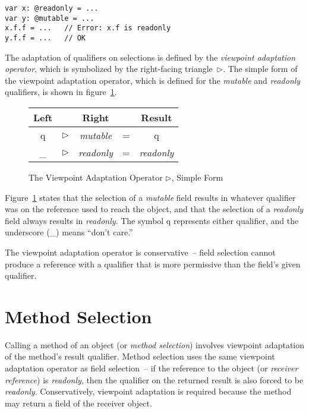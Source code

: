 \begin{lstlisting}[caption={Field Selection},float={htp},label={lst-field-sel}]
var x: @readonly = ...
var y: @mutable = ...
x.f.f = ...   // Error: x.f is readonly
y.f.f = ...   // OK
\end{lstlisting}

The adaptation of qualifiers on selections is defined by the {\em viewpoint adaptation operator},
which is symbolized by the right-facing triangle~$\triangleright$.
The simple form of the viewpoint adaptation operator, which is defined for
the {\em mutable} and {\em readonly} qualifiers, is shown in figure~\ref{fig-vp-simple}.

\begin{figure}[htp]
	\center
	\begin{tabular}{ccccc}
		Left & & Right & & Result \\
		\hline
		q & $\triangleright$ & {\em mutable} & = & q \\
		\_ & $\triangleright$ & {\em readonly} & = & {\em readonly} \\
	\end{tabular}
	\caption{The Viewpoint Adaptation Operator $\triangleright$, Simple Form}
	\label{fig-vp-simple}
\end{figure}

Figure~\ref{fig-vp-simple} states that the selection of a {\em mutable}
field results in whatever qualifier was on the reference used to reach the object,
and that the selection of a {\em readonly} field always results in {\em readonly}.
The symbol q represents either qualifier, and the underscore (\_) means ``don't care.''

The viewpoint adaptation operator is conservative~-- field selection
cannot produce a reference with a qualifier that is more permissive
than the field's given qualifier.

\section{Method Selection} \label{sec-method-sel}

Calling a method of an object (or {\em method selection}) involves
viewpoint adaptation of the method's result qualifier.
Method selection uses the same viewpoint adaptation operator as field selection~--
if the reference to the object (or {\em receiver reference})
is {\em readonly}, then the qualifier on the returned result is also
forced to be {\em readonly}.
Conservatively, viewpoint adaptation is required because the method may return
a field of the receiver object.


